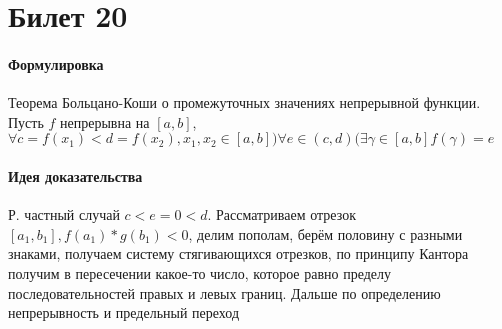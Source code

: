 \documentclass[a4paper,10pt]{article}
\begin{document}
	\section{Билет 20}
	\begin{center} 
		\item \paragraph{Формулировка} 
	\end{center}
	Теорема Больцано-Коши о промежуточных значениях непрерывной функции. Пусть $f$ непрерывна на $[a,b]$, $\forall c = f(x_{1}) < d = f(x_{2}), x_{1}, x_{2} \in [a,b]) \forall e \in (c,d) (\exists \gamma \in [a,b] f(\gamma) = e$
	\begin{center} 
		\item \paragraph{Идея доказательства} 
	\end{center}
	Р. частный случай $c < e = 0 < d$. Рассматриваем отрезок $[a_{1}, b_{1}], f(a_{1})*g(b_{1}) < 0$, делим пополам, берём половину с разными знаками, получаем систему стягивающихся отрезков, по принципу Кантора получим в пересечении какое-то число, которое равно пределу последовательностей правых и левых границ. Дальше по определению непрерывность и предельный переход
\end{document}
